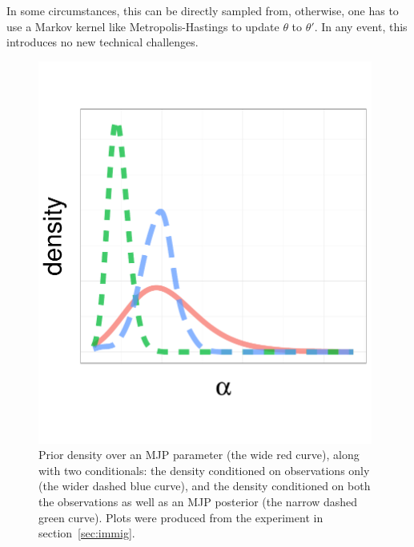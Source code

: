 In some circumstances, this can be directly sampled from, otherwise, one has to use a Markov kernel like Metropolis-Hastings to update $\theta$ to $\theta'$. 
In any event, this introduces no new technical challenges.
  \begin{figure}%
  \centering
  \begin{minipage}[hp]{0.35\linewidth}
  \centering
    \vspace{-0 in}
    \includegraphics [width=0.98\textwidth, angle=0]{figs/dist_beta.pdf}
  \end{minipage}
  \begin{minipage}[hp]{0.64\linewidth}
   \vspace{-0.3 in}
  \caption{Prior density over an MJP parameter (the wide red curve), along with two conditionals: 
    the density conditioned on observations only (the wider dashed blue curve), and the density conditioned on both the observations as well as an MJP posterior (the narrow dashed green curve). 
  Plots were produced from the experiment in section~\ref{sec:immig}.}
     \label{fig:hist}
  \end{minipage}
   \vspace{-0.4 in}
  \end{figure}

